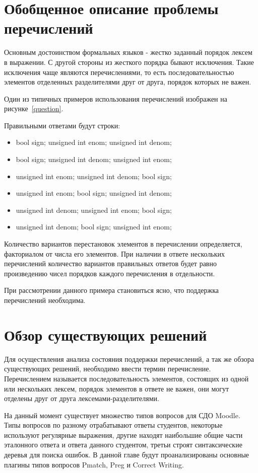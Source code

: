 \documentclass[a4paper,english,russian]{G2-105}
\begin{document}
\section{Обобщенное описание проблемы перечислений}

\par Основным достоинством формальных языков - жестко заданный порядок лексем в выражении. С другой стороны из жесткого порядка бывают исключения. Такие исключения чаще являются перечислениями, то есть последовательностью элементов отделенных разделителями друг от друга, порядок которых не важен.
\par Один из типичных примеров использования перечислений изображен на рисунке~\ref{question}.

\par Правильными ответами будут строки:
\begin{itemize}
    \item bool sign; unsigned int enom; unsigned int denom;
    \item bool sign; unsigned int denom; unsigned int enom;
    \item unsigned int enom; unsigned int denom; bool sign;
    \item unsigned int enom; bool sign; unsigned int denom;
    \item unsigned int denom; unsigned int enom; bool sign;
    \item unsigned int denom; bool sign; unsigned int enom;
\end{itemize}
\par Количество вариантов перестановок элементов в перечислении определяется, факториалом от числа его элементов. При наличии в ответе нескольких перечислений количество вариантов правильных ответов будет равно произведению чисел порядков каждого перечисления в отдельности.
\par При рассмотрении данного примера становиться ясно, что поддержка перечислений необходима.
\section{Обзор существующих решений}

\par Для осуществления анализа состояния поддержки перечислений, а так же обзора существующих решений, необходимо ввести термин перечисление. Перечислением называется последовательность элементов, состоящих из одной или нескольких лексем, порядок элементов в ответе не важен, они могут отделены друг от друга лексемами-разделителями.
\par На данный момент существует множество типов вопросов для СДО Moodle. Типы вопросов по разному отрабатывают ответы студентов, некоторые используют регулярные выражения, другие находят наибольшие общие части эталонного ответа и ответа данного студентом, третьи строят синтаксические деревья для поиска ошибок. В данной главе будут проанализированы основные плагины типов вопросов Pmatch, Preg и Correct Writing.
\end{document}
